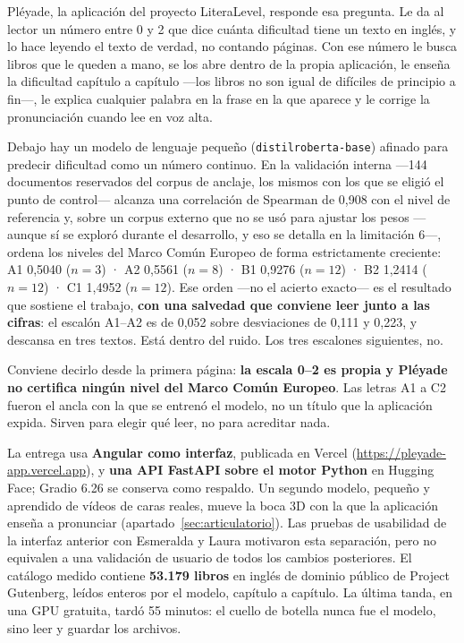 \documentclass[11pt,a4paper]{article}
\newcommand{\cod}[1]{\texttt{\small #1}}
\begin{document}
Pléyade, la aplicación del proyecto LiteraLevel, responde esa pregunta. Le da al lector un número
entre 0 y 2 que dice cuánta dificultad tiene un texto en inglés, y lo hace leyendo el
texto de verdad, no contando páginas. Con ese número le busca libros que le queden a
mano, se los abre dentro de la propia aplicación, le enseña la dificultad capítulo
a capítulo —los libros no son igual de difíciles de principio a fin—, le explica
cualquier palabra en la frase en la que aparece y le corrige la pronunciación cuando
lee en voz alta.

Debajo hay un modelo de lenguaje pequeño (\cod{distilroberta-base}) afinado para
predecir dificultad como un número continuo. En la validación interna —144 documentos
reservados del corpus de anclaje, los mismos con los que se eligió el punto de control—
alcanza una correlación de Spearman de 0,908 con el nivel de referencia y, sobre un corpus externo
que no se usó para ajustar los pesos —aunque sí se exploró durante el desarrollo, y eso
se detalla en la limitación 6—, ordena los niveles del Marco Común Europeo de forma
estrictamente
creciente: A1 0,5040 ($n{=}3$) · A2 0,5561 ($n{=}8$) · B1 0,9276 ($n{=}12$) ·
B2 1,2414 ($n{=}12$) · C1 1,4952 ($n{=}12$). Ese orden —no el acierto exacto— es el
resultado que sostiene el trabajo, \textbf{con una salvedad que conviene leer junto a las
cifras}: el escalón A1--A2 es de 0,052 sobre desviaciones de 0,111 y 0,223, y descansa en
tres textos. Está dentro del ruido. Los tres escalones siguientes, no.

Conviene decirlo desde la primera página: \textbf{la escala 0--2 es propia y
Pléyade no certifica ningún nivel del Marco Común Europeo}. Las letras A1 a C2
fueron el ancla con la que se entrenó el modelo, no un título que la aplicación
expida. Sirven para elegir qué leer, no para acreditar nada.

La entrega usa \textbf{Angular como interfaz}, publicada en Vercel
(\url{https://pleyade-app.vercel.app}), y \textbf{una API FastAPI sobre el motor Python} en
Hugging Face; Gradio 6.26 \parencite{abid2019gradio} se conserva como respaldo. Un segundo
modelo, pequeño y aprendido de vídeos de caras reales, mueve la boca 3D con la que la
aplicación enseña a pronunciar (apartado~\ref{sec:articulatorio}). Las pruebas de usabilidad
de la interfaz anterior con Esmeralda y Laura motivaron esta separación, pero no equivalen
a una validación de usuario de todos los cambios posteriores. El catálogo medido
contiene \textbf{53.179 libros} en inglés de dominio
público de Project Gutenberg, leídos enteros por el modelo, capítulo a capítulo. La última
tanda, en una GPU gratuita, tardó 55 minutos: el cuello de botella nunca fue el modelo,
sino leer y guardar los archivos.
\end{document}
